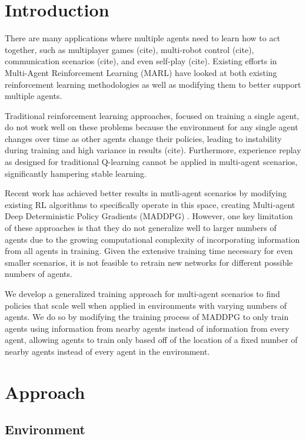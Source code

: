 \documentclass{article}
\begin{document}
\section{Introduction}
\label{submission}

There are many applications where multiple agents need to learn how to act together, such as multiplayer games (cite), multi-robot control (cite), communication scenarios (cite), and even self-play (cite). Existing efforts in Multi-Agent Reinforcement Learning (MARL) have looked at both existing reinforcement learning methodologies as well as modifying them to better support multiple agents.

Traditional reinforcement learning approaches, focused on training a single agent, do not work well on these problems because the environment for any single agent changes over time as other agents change their policies, leading to instability during training and high variance in results (cite). Furthermore, experience replay as designed for traditional Q-learning cannot be applied in multi-agent scenarios, significantly hampering stable learning.

Recent work has achieved better results in mutli-agent scenarios by modifying existing RL algorithms to specifically operate in this space, creating Multi-agent Deep Deterministic Policy Gradients (MADDPG) \cite{maddpg}. However, one key limitation of these approaches is that they do not generalize well to larger numbers of agents due to the growing computational complexity of incorporating information from all agents in training. Given the extensive training time necessary for even smaller scenarios, it is not feasible to retrain new networks for different possible numbers of agents.

We develop a generalized training approach for multi-agent scenarios to find policies that scale well when applied in environments with varying numbers of agents. We do so by modifying the training process of MADDPG to only train agents using information from nearby agents instead of information from every agent, allowing agents to train only based off of the location of a fixed number of nearby agents instead of every agent in the environment.

\section{Approach}

\subsection{Environment}
\end{document}
